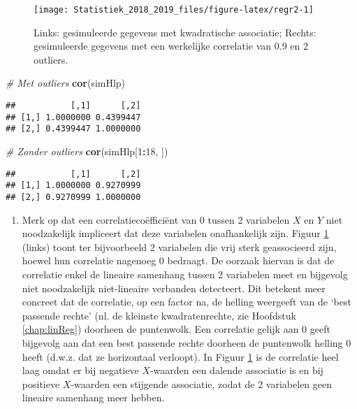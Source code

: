 \documentclass[12pt,dutch,coursenotes]{book}
\newenvironment{Shaded}{\begin{snugshade}}{\end{snugshade}}
\newcommand{\KeywordTok}[1]{\textcolor[rgb]{0.13,0.29,0.53}{\textbf{#1}}}
\newcommand{\DecValTok}[1]{\textcolor[rgb]{0.00,0.00,0.81}{#1}}
\newcommand{\CommentTok}[1]{\textcolor[rgb]{0.56,0.35,0.01}{\textit{#1}}}
\newcommand{\OperatorTok}[1]{\textcolor[rgb]{0.81,0.36,0.00}{\textbf{#1}}}
\newcommand{\NormalTok}[1]{#1}
\providecommand{\tightlist}{%
  \setlength{\itemsep}{0pt}\setlength{\parskip}{0pt}}
\theoremstyle{definition}
\theoremstyle{definition}
\theoremstyle{definition}
\theoremstyle{remark}
\begin{document}
\begin{figure}

{\centering \texttt{[image: Statistiek\_2018\_2019\_files/figure-latex/regr2-1]} 

}

\caption{Links: gesimuleerde gegevens met kwadratische associatie; Rechts: gesimuleerde gegevens met een werkelijke correlatie van 0.9 en 2 outliers.}\label{fig:regr2}
\end{figure}

\begin{Shaded}
\begin{Highlighting}[]
\CommentTok{# Met outliers}
\KeywordTok{cor}\NormalTok{(simHlp)}
\end{Highlighting}
\end{Shaded}

\begin{verbatim}
##           [,1]      [,2]
## [1,] 1.0000000 0.4399447
## [2,] 0.4399447 1.0000000
\end{verbatim}

\begin{Shaded}
\begin{Highlighting}[]
\CommentTok{# Zonder outliers}
\KeywordTok{cor}\NormalTok{(simHlp[}\DecValTok{1}\OperatorTok{:}\DecValTok{18}\NormalTok{, ])}
\end{Highlighting}
\end{Shaded}

\begin{verbatim}
##           [,1]      [,2]
## [1,] 1.0000000 0.9270999
## [2,] 0.9270999 1.0000000
\end{verbatim}

\begin{enumerate}
\def\labelenumi{\arabic{enumi}.}
\setcounter{enumi}{1}
\tightlist
\item
  Merk op dat een correlatiecoëfficiënt van 0 tussen 2 variabelen \(X\)
  en \(Y\) niet noodzakelijk impliceert dat deze variabelen
  onafhankelijk zijn. Figuur \ref{fig:regr2} (links) toont ter
  bijvoorbeeld 2 variabelen die vrij sterk geassocieerd zijn, hoewel hun
  correlatie nagenoeg 0 bedraagt. De oorzaak hiervan is dat de
  correlatie enkel de lineaire samenhang tussen 2 variabelen meet en
  bijgevolg niet noodzakelijk niet-lineaire verbanden detecteert. Dit
  betekent meer concreet dat de correlatie, op een factor na, de helling
  weergeeft van de `best passende rechte' (nl. de kleinste
  kwadratenrechte, zie Hoofdstuk \ref{chap:linReg}) doorheen de
  puntenwolk. Een correlatie gelijk aan 0 geeft bijgevolg aan dat een
  best passende rechte doorheen de puntenwolk helling 0 heeft (d.w.z.
  dat ze horizontaal verloopt). In Figuur \ref{fig:regr2} is de
  correlatie heel laag omdat er bij negatieve \(X\)-waarden een dalende
  associatie is en bij positieve \(X\)-waarden een stijgende associatie,
  zodat de 2 variabelen geen lineaire samenhang meer hebben.
\end{enumerate}
\end{document}
